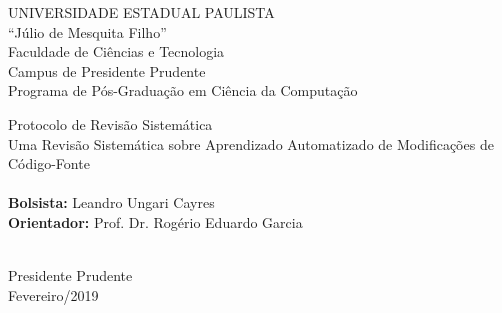 \begin{titlepage}

\begin{center}
\vspace*{10pt}
{\huge UNIVERSIDADE ESTADUAL PAULISTA\\``Júlio de Mesquita Filho''\\}
\vspace{44pt}
{\Large Faculdade de Ciências e Tecnologia\\Campus de Presidente Prudente\\}
\vspace{44pt}
{\Large Programa de Pós-Graduação em Ciência da Computação}

\vspace{65pt}
{\Large Protocolo de Revisão Sistemática}\\
\vspace{65pt}
{\Large Uma Revisão Sistemática sobre Aprendizado Automatizado de Modificações de Código-Fonte}\\

{\flushleft
	{\normalsize
		\vspace{15mm}
		\hrulefill\\
		\vspace{5mm}
		\hspace{10mm} \textbf{Bolsista: }Leandro Ungari Cayres\\
		\hspace{10mm} \textbf{Orientador: }Prof. Dr. Rogério Eduardo Garcia\\
		\vspace{2mm}
		\hrulefill\\
		
	}
}


\vspace*{\fill}
{\Large Presidente Prudente \\Fevereiro/2019}

\end{center}

\vfill%
\clearpage

\end{titlepage}